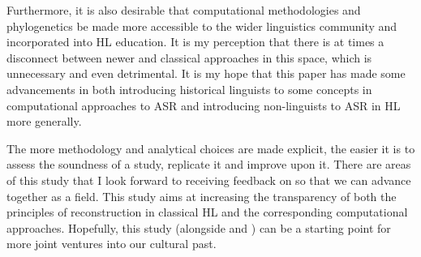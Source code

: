 \documentclass[12pt,letterpaper]{article}
\begin{document}
Furthermore, it is also desirable that computational methodologies and phylogenetics be made more accessible to the wider linguistics community and incorporated into HL education. It is my perception that there is at times a disconnect between newer and classical approaches in this space, which is unnecessary and even detrimental. It is my hope that this paper has made some advancements in both introducing historical linguists to some concepts in computational approaches to ASR and introducing non-linguists to ASR in HL more generally.

The more methodology and analytical choices are made explicit, the easier it is to assess the soundness of a study, replicate it and improve upon it. There are areas of this study that I look forward to receiving feedback on so that we can advance together as a field. This study aims at increasing the transparency of both the principles of reconstruction in classical HL and the corresponding computational approaches. Hopefully, this study (alongside \citealt{carling2021reconstructing} and \citealt{goldstein_2022}) can be a starting point for more joint ventures into our cultural past.







\end{document}

